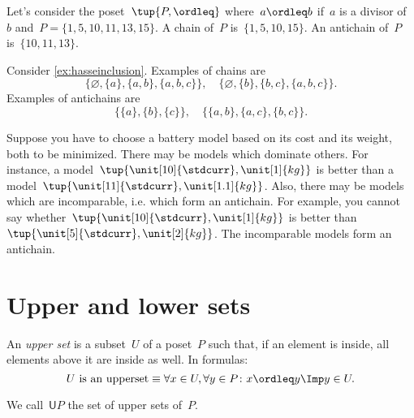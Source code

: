 \begin{example}
    Let's consider the poset~$\tup{P,\ordleq}$ where~$a\ordleq b$ if~$a$ is a divisor of~$b$ and~$P=\{1,5,10,11,13,15\}$. A chain of~$P$ is~$\{1,5,10,15\}$. An antichain of~$P$ is~$\{10,11,13\}$.
\end{example}

\begin{example}
    Consider \cref{ex:hasseinclusion}. Examples of chains are
    \begin{equation}
        \{\varnothing,\{a\},\{a,b\},\{a,b,c\}\}, \quad  \{\varnothing,\{b\},\{b,c\},\{a,b,c\}\}.
    \end{equation}
    Examples of antichains are
    \begin{equation}
        \{\{a\},\{b\},\{c\}\}, \quad \{ \{a,b\},\{a,c\}, \{b,c\}\}.
    \end{equation}
\end{example}

\begin{example}
    \label{ex:battery}
    Suppose you have to choose a battery model based on its cost and its weight, both to be minimized. There may be models which dominate others. For instance, a model~$\tup{\unit[10]{\stdcurr},\unit[1]{kg}}$ is better than a model~$\tup{\unit[11]{\stdcurr},\unit[1.1]{kg}}$. Also, there may be models which are incomparable, i.e. which form an antichain. For example, you cannot say whether~$\tup{\unit[10]{\stdcurr},\unit[1]{kg}}$ is better than~$\tup{\unit[5]{\stdcurr},\unit[2]{kg}}$. The incomparable models form an antichain.
\end{example}


\section{Upper and lower sets}

\begin{definition}
    \label{def:upperset}
    An \emph{upper set} is a subset~$U$ of a poset~$P$ such
    that, if an element is inside, all elements above it are inside as well.
    In formulas:
    \begin{equation}
        \text{$U$ is an upperset} \equiv \forall x\in U, \forall y\in P\colon x\ordleq y \Imp y\in U.
    \end{equation}
\end{definition}
\begin{remark}
    We call~$\mathsf{U}P$ the set of upper sets of~$P$.
\end{remark}

